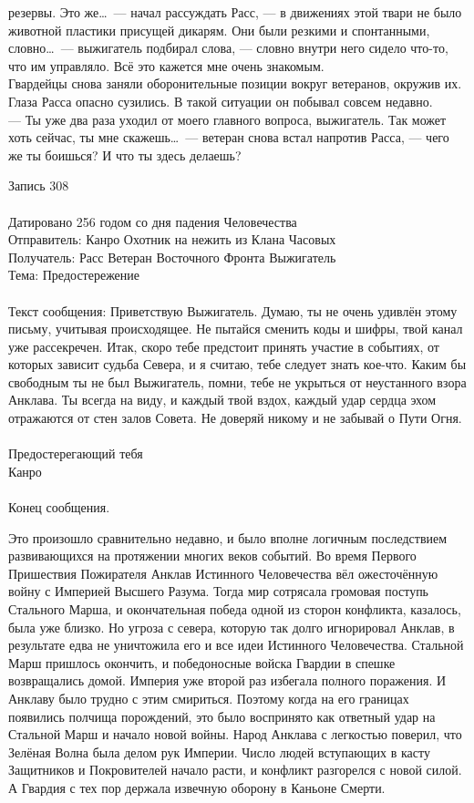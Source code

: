 резервы. Это же\ldots\ --- начал рассуждать Расс, --- в движениях этой твари не 
было животной пластики присущей дикарям. Они были резкими и спонтанными, 
словно\ldots\ --- выжигатель подбирал слова, --- словно внутри него сидело 
что-то, что им управляло. Всё это кажется мне очень знакомым.\\
Гвардейцы снова заняли оборонительные позиции вокруг ветеранов, окружив их. 
Глаза Расса опасно сузились. В такой ситуации он побывал совсем недавно.\\
--- Ты уже два раза уходил от моего главного вопроса, выжигатель. Так может 
хоть сейчас, ты мне скажешь\ldots\ --- ветеран снова встал напротив Расса, --- 
чего же ты боишься? И что ты здесь делаешь?

\newpage

\begin{mssg}{%
Запись 308\\
\\
Датировано 256 годом со дня падения Человечества\\
Отправитель: Канро Охотник на нежить из Клана Часовых\\
Получатель: Расс Ветеран Восточного Фронта Выжигатель\\
Тема: Предостережение\\
\\
Текст сообщения: 
}%
Приветствую Выжигатель. Думаю, ты не очень удивлён этому письму, учитывая 
происходящее. Не пытайся сменить коды и шифры, твой канал уже рассекречен. Итак, 
скоро тебе предстоит принять участие в событиях, от которых зависит судьба 
Севера, и я считаю, тебе следует знать кое-что. Каким бы свободным ты не был 
Выжигатель, помни, тебе не укрыться от неустанного взора Анклава. Ты всегда на 
виду, и каждый твой вздох, каждый удар сердца эхом отражаются от стен залов 
Совета. Не доверяй никому и не забывай о Пути Огня.\\
\\
Предостерегающий тебя \\
Канро\\
\\
Конец сообщения. 
\end{mssg}

  
Это произошло сравнительно недавно, и было вполне логичным последствием 
развивающихся на протяжении многих веков событий. Во время Первого Пришествия 
Пожирателя Анклав Истинного Человечества вёл ожесточённую войну с Империей 
Высшего Разума. Тогда мир сотрясала громовая поступь Стального Марша, и 
окончательная победа одной из сторон конфликта, казалось, была уже близко. Но 
угроза с севера, которую так долго игнорировал Анклав, в результате едва не 
уничтожила его и все идеи Истинного Человечества. Стальной Марш пришлось 
окончить, и победоносные войска Гвардии в спешке возвращались домой. Империя уже 
второй раз избегала полного поражения. И Анклаву было трудно с этим смириться. 
Поэтому когда на его границах появились полчища порождений, это было воспринято 
как ответный удар на Стальной Марш и начало новой войны. Народ Анклава с 
легкостью поверил, что Зелёная Волна была делом рук Империи. Число людей 
вступающих в касту Защитников и Покровителей начало расти, и конфликт разгорелся 
с новой силой. А Гвардия с тех пор держала извечную оборону в Каньоне Смерти.

